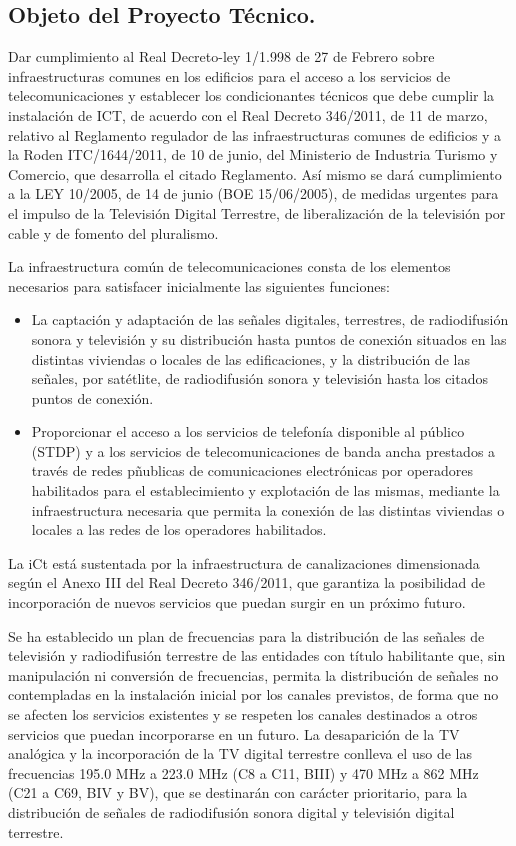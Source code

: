 \subsection{Objeto del Proyecto Técnico.}
Dar cumplimiento al Real Decreto-ley 1/1.998 de 27 de Febrero sobre infraestructuras comunes en los
edificios para el acceso a los servicios de telecomunicaciones y establecer los condicionantes
técnicos que debe cumplir la instalación de ICT, de acuerdo con el Real Decreto 346/2011, de 11 de marzo, relativo al Reglamento regulador de las infraestructuras comunes de edificios y a la Roden ITC/1644/2011, de 10 de junio, del Ministerio de Industria Turismo y Comercio, que desarrolla el citado Reglamento.
Así mismo se dará cumplimiento a la LEY 10/2005, de 14 de junio (BOE 15/06/2005), de medidas urgentes para el impulso de la Televisión Digital Terrestre, de liberalización de la televisión por cable y de fomento del pluralismo.

La infraestructura común de telecomunicaciones consta de los elementos necesarios para satisfacer inicialmente las siguientes funciones:

\begin{itemize}
	\item La captación y adaptación de las señales digitales, terrestres, de radiodifusión sonora y televisión y su distribución hasta puntos de conexión situados en las distintas viviendas o locales de las edificaciones, y la distribución de las señales, por satétlite, de radiodifusión sonora y televisión hasta los citados puntos de conexión.
	\item Proporcionar el acceso a los servicios de telefonía disponible al público (STDP) y a los servicios de telecomunicaciones de banda ancha prestados a través de redes pñublicas de comunicaciones electrónicas por operadores habilitados para el establecimiento y explotación de las mismas, mediante la infraestructura necesaria que permita la conexión de las distintas viviendas o locales a las redes de los operadores habilitados.
\end{itemize}

La iCt está sustentada por la infraestructura de canalizaciones dimensionada según el Anexo III del Real Decreto 346/2011, que garantiza la posibilidad de incorporación de nuevos servicios que puedan surgir en un próximo futuro.

Se ha establecido un plan de frecuencias para la distribución de las señales de televisión y radiodifusión terrestre de las entidades con título habilitante que, sin manipulación ni conversión de frecuencias, permita la distribución de señales no contempladas en la instalación inicial por los canales previstos, de forma que no se afecten los servicios existentes y se respeten los canales destinados a otros servicios que puedan incorporarse en un futuro. La desaparición de la TV analógica y la incorporación de la TV digital terrestre conlleva el uso de las frecuencias 195.0 MHz a 223.0 MHz (C8 a C11, BIII) y 470 MHz a 862 MHz (C21 a C69, BIV y BV), que se destinarán con carácter prioritario, para la distribución de señales de radiodifusión sonora digital y televisión digital terrestre.

